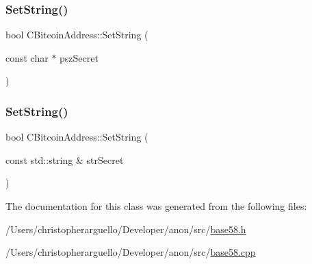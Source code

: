 \subsubsection{\texorpdfstring{Set\+String()}{SetString()}\hspace{0.1cm}{\footnotesize\ttfamily [1/2]}}
{\footnotesize\ttfamily bool C\+Bitcoin\+Address\+::\+Set\+String (\begin{DoxyParamCaption}\item[{const char $\ast$}]{psz\+Secret }\end{DoxyParamCaption})}

\mbox{\label{class_c_bitcoin_address_a2a4b506cd579e075a954336d56db818f}} 
\subsubsection{\texorpdfstring{Set\+String()}{SetString()}\hspace{0.1cm}{\footnotesize\ttfamily [2/2]}}
{\footnotesize\ttfamily bool C\+Bitcoin\+Address\+::\+Set\+String (\begin{DoxyParamCaption}\item[{const std\+::string \&}]{str\+Secret }\end{DoxyParamCaption})}



The documentation for this class was generated from the following files\+:\begin{DoxyCompactItemize}
\item 
/\+Users/christopherarguello/\+Developer/anon/src/\mbox{\hyperlink{base58_8h}{base58.\+h}}\item 
/\+Users/christopherarguello/\+Developer/anon/src/\mbox{\hyperlink{base58_8cpp}{base58.\+cpp}}\end{DoxyCompactItemize}
